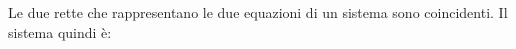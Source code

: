 Le due rette che rappresentano le due equazioni di un sistema sono coincidenti. Il sistema quindi è: 
